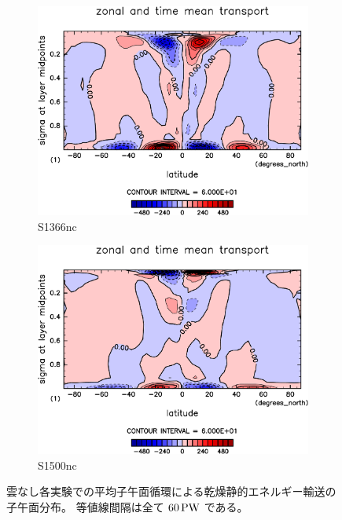 \documentclass[body]{subfiles}
\begin{document}
\begin{figure}[t]
	\centering
	\begin{subfigure}{.4\textwidth}
		\centering
		\includegraphics[width=\columnwidth]{S1366-nc/MeriHeatTransTest@dryStatEn_M,time=3650:4015-crop-rotate.pdf}
		\caption{S1366nc}\label{乾燥静的エネルギー平均子午面循環S1366nc}
	\end{subfigure}
	\begin{subfigure}{.4\textwidth}
		\centering
		\includegraphics[width=\columnwidth]{S1500-nc/MeriHeatTransTest@dryStatEn_M,time=3650:4015-crop-rotate.pdf}
		\caption{S1500nc}\label{乾燥静的エネルギー平均子午面循環S1500nc}
	\end{subfigure}
	\caption[雲なし各実験での平均子午面循環による乾燥静的エネルギー輸送の子午面分布]{
		雲なし各実験での平均子午面循環による乾燥静的エネルギー輸送の子午面分布。
		等値線間隔は全て \(60\hmu{PW}\) である。
	}\label{乾燥静的エネルギー平均子午面循環nc}
\end{figure}
\end{document}
